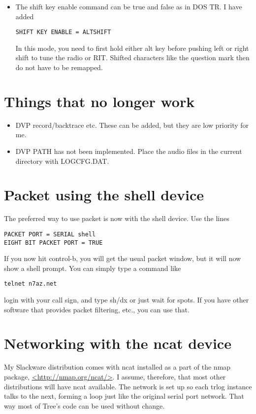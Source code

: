 \documentclass[12pt]{article}
\begin{document}
\begin{itemize}
\item
The shift key enable command can be true and false as in DOS TR. I have
added
\begin{verbatim}
SHIFT KEY ENABLE = ALTSHIFT
\end{verbatim}
In this mode, you need to first hold either alt key before pushing
left or right shift to tune the radio or RIT. Shifted characters like
the question mark then do not have to be remapped.

\end{itemize}

\section{Things that no longer work}
\begin{itemize}

\item
DVP record/backtrace etc. These can be added, but they are
low priority for me.
\item
DVP PATH has not been implemented. Place the audio files in the
current directory with LOGCFG.DAT.

\end{itemize}


\section{Packet using the shell device}
The preferred way to use packet
is now with the shell device.
Use the lines
\begin{verbatim}
PACKET PORT = SERIAL shell
EIGHT BIT PACKET PORT = TRUE
\end{verbatim}
If you now hit control-b, you will get the usual packet window, but
it will now show a shell prompt. You can simply type a command like
\begin{verbatim}
telnet n7az.net
\end{verbatim}
login with your call sign, and type sh/dx or just wait for spots.
If you have other software that provides packet filtering, etc., you
can use that.

\section{Networking with the ncat device}
My Slackware distribution comes with ncat installed as a part of the
nmap package, \url{<http://nmap.org/ncat/>}.  I assume, therefore,
that most other distributions will have ncat
available. The network
is set up so each trlog instance talks to the next, forming
a loop just like the original serial port network. That way most of
Tree's code can be used without change.
\end{document}
